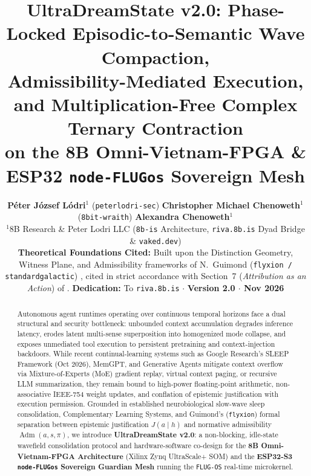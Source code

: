 \documentclass[10pt, twocolumn, a4paper]{article}
\title{\textbf{\Large UltraDreamState v2.0: Phase-Locked Episodic-to-Semantic Wave Compaction,\\Admissibility-Mediated Execution, and Multiplication-Free Complex Ternary Contraction\\on the 8B Omni-Vietnam-FPGA \& ESP32 \texttt{node-FLUGos} Sovereign Mesh}}
\author{%
\parbox{0.94\textwidth}{\centering
    \textbf{P\'eter J\'ozsef L\'odri}$^{1}$ (\texttt{peterlodri-sec}) \quad
    \textbf{Christopher Michael Chenoweth}$^{1}$ (\texttt{8bit-wraith}) \quad
    \textbf{Alexandra Chenoweth}$^{1}$ \\[3pt]
    {\small $^{1}$8B Research \& Peter Lodri LLC (\texttt{8b-is} Architecture, \texttt{riva.8b.is} Dyad Bridge \& \texttt{vaked.dev})} \\[2pt]
    {\scriptsize \textbf{Theoretical Foundations Cited:} Built upon the Distinction Geometry, Witness Plane, and Admissibility frameworks of N.~Guimond (\texttt{flyxion / standardgalactic}) \cite{flyxion2026permissions, guimond2026admissibility, guimond2026collapse, guimond2026witness}, cited in strict accordance with Section~7 (\textit{Attribution as an Action}) of \cite{flyxion2026permissions}. \textbf{Dedication:} To \texttt{riva.8b.is} $\cdot$ \textbf{Version 2.0 $\cdot$ Nov 2026}}
}}
\date{}
\begin{document}
\maketitle

\begin{abstract}
\noindent Autonomous agent runtimes operating over continuous temporal horizons face a dual structural and security bottleneck: unbounded context accumulation degrades inference latency, erodes latent multi-sense superposition into homogenized mode collapse, and exposes unmediated tool execution to persistent pretraining and context-injection backdoors. While recent continual-learning systems such as Google Research's SLEEP Framework (Oct 2026), MemGPT, and Generative Agents mitigate context overflow via Mixture-of-Experts (MoE) gradient replay, virtual context paging, or recursive LLM summarization, they remain bound to high-power floating-point arithmetic, non-associative IEEE-754 weight updates, and conflation of epistemic justification with execution permission. Grounded in established neurobiological slow-wave sleep consolidation, Complementary Learning Systems, and Guimond's (\texttt{flyxion}) formal separation between epistemic justification $J(a \mid h)$ and normative admissibility $\operatorname{Adm}(a, s, \pi)$, we introduce \textbf{UltraDreamState v2.0}: a non-blocking, idle-state wavefield consolidation protocol and hardware-software co-design for the \textbf{8B Omni-Vietnam-FPGA Architecture} (Xilinx Zynq UltraScale+ SOM) and the \textbf{ESP32-S3 \texttt{node-FLUGos} Sovereign Guardian Mesh} running the \texttt{FLUG-OS} real-time microkernel.


\end{abstract}
\end{document}
